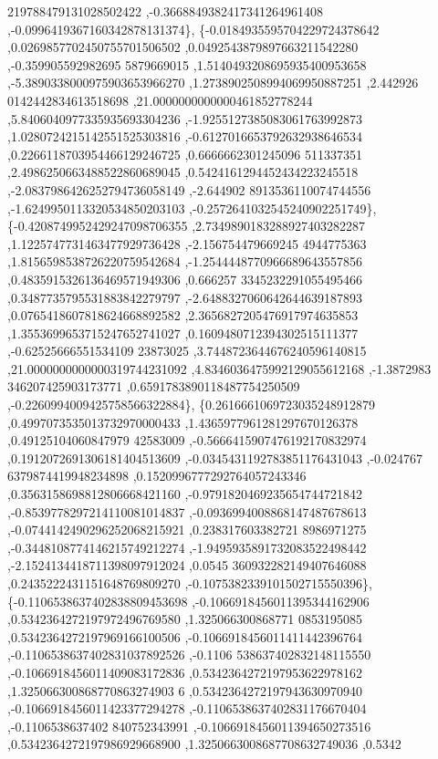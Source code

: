 \begin{DoxyCode}
      219788479131028502422 ,-0.3668849382417341264961408 ,-0.0996419367160342878131374\},
\{-0.0184935595704229724378642 ,0.0269857702450755701506502 ,0.0492543879897663211542280 ,-0.359905592982695
      5879669015 ,1.5140493208695935400953658 ,-5.3890338000975903653966270 ,1.2738902508994069950887251 ,2.442926
      0142442834613518698 ,21.0000000000000461852778244 ,5.8406040977335935693304236 ,-1.9255127385083061763992873
       ,1.0280724215142551525303816 ,-0.6127016653792632938646534 ,0.2266118703954466129246725 ,0.6666662301245096
      511337351 ,2.4986250663488522860689045 ,0.5424161294452434223245518 ,-2.0837986426252794736058149 ,-2.644902
      8913536110074744556 ,-1.6249950113320534850203103 ,-0.2572641032545240902251749\},
\{-0.4208749952429247098706355 ,2.7349890183288927403282287 ,1.1225747731463477929736428 ,-2.156754479669245
      4944775363 ,1.8156598538726220759542684 ,-1.2544448770966689643557856 ,0.4835915326136469571949306 ,0.666257
      3345232291055495466 ,0.3487735795531883842279797 ,-2.6488327060642644639187893 ,0.0765418607818624668892582 
      ,2.3656827205476917974635853 ,1.3553699653715247652741027 ,0.1609480712394302515111377 ,-0.62525666551534109
      23873025 ,3.7448723644676240596140815 ,21.0000000000000319744231092 ,4.8346036475992129055612168 ,-1.3872983
      346207425903173771 ,0.6591783890118487754250509 ,-0.2260994009425758566322884\},
\{0.2616661069723035248912879 ,0.4997073535013732970000433 ,1.4365977961281297670126378 ,0.49125104060847979
      42583009 ,-0.5666415907476192170832974 ,0.1912072691306181404513609 ,-0.0345431192783851176431043 ,-0.024767
      6379874419948234898 ,0.1520996777292764057243346 ,0.3563158698812806668421160 ,-0.9791820469235654744721842 
      ,-0.8539778297214110081014837 ,-0.0936994008868147487678613 ,-0.0744142490296252068215921 ,0.238317603382721
      8986971275 ,-0.3448108774146215749212274 ,-1.9495935891732083522498442 ,-2.1524134418711398097912024 ,0.0545
      360932282149407646088 ,0.2435222431151648769809270 ,-0.1075382339101502715550396\},
\{-0.1106538637402838809453698 ,-0.1066918456011395344162906 ,0.5342364272197972496769580 ,1.325066300868771
      0853195085 ,0.5342364272197969166100506 ,-0.1066918456011411442396764 ,-0.1106538637402831037892526 ,-0.1106
      538637402832148115550 ,-0.1066918456011409083172836 ,0.5342364272197953622978162 ,1.325066300868770863274903
      6 ,0.5342364272197943630970940 ,-0.1066918456011423377294278 ,-0.1106538637402831176670404 ,-0.1106538637402
      840752343991 ,-0.1066918456011394650273516 ,0.5342364272197986929668900 ,1.3250663008687708632749036 ,0.5342

\end{DoxyCode}
